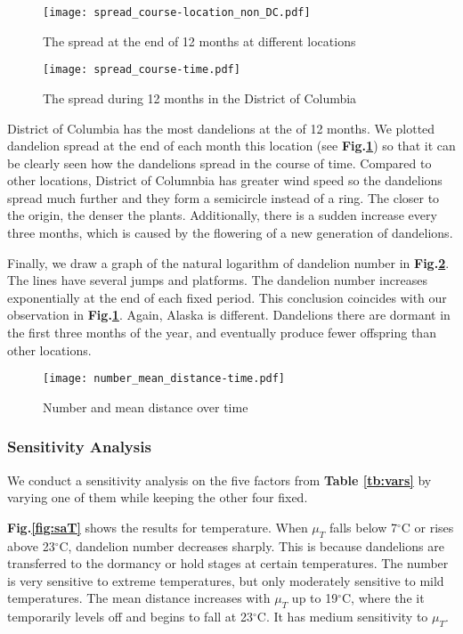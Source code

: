 \documentclass[12pt]{article}
\begin{document}
			\begin{figure}[htbp]
				\centering
				\texttt{[image: spread\_course-location\_non\_DC.pdf]}
				\caption{The spread at the end of 12 months at different locations}
				\label{fig:scatter5loc}
				
				\vspace{1cm}

				\texttt{[image: spread\_course-time.pdf]}
				\caption{The spread during 12 months in the District of Columbia}
				\label{fig:spreadDC}
			\end{figure}
			\newpage
			
			District of Columbia has the most dandelions at the of 12 months.  We plotted dandelion spread at the end of each month this location (see \textbf{Fig.\ref{fig:spreadDC}}) so that it can be clearly seen how the dandelions spread in the course of time.  Compared to other locations, District of Columnbia has greater wind speed so the dandelions spread much further and they form a semicircle instead of a ring.  The closer to the origin, the denser the plants.  Additionally, there is a sudden increase every three months, which is caused by the flowering of a new generation of dandelions.
			
			Finally, we draw a graph of the natural logarithm of dandelion number in \textbf{Fig.\ref{fig:time}}.  The lines have several jumps and platforms.  The dandelion number increases exponentially at the end of each fixed period.  This conclusion coincides with our observation in \textbf{Fig.\ref{fig:spreadDC}}.  Again, Alaska is different.  Dandelions there are dormant in the first three months of the year, and eventually produce fewer offspring than other locations.
			
			\begin{figure}[htbp]
				\centering
				\texttt{[image: number\_mean\_distance-time.pdf]}
				\caption{Number and mean distance over time}
				\label{fig:time}
			\end{figure}
		
		
		
		\subsubsection{Sensitivity Analysis}
			
			We conduct a sensitivity analysis on the five factors from \textbf{Table \ref{tb:vars}} by varying one of them while keeping the other four fixed.  
			
			\textbf{Fig.\ref{fig:saT}} shows the results for temperature.  When $\mu_T$ falls below 7$^\circ$C or rises above 23$^\circ$C, dandelion number decreases sharply.  This is because dandelions are transferred to the dormancy or hold stages at certain temperatures.  The number is very sensitive to extreme temperatures, but only moderately sensitive to mild temperatures.  The mean distance increases with $\mu_T$ up to 19$^\circ$C, where the it temporarily levels off and begins to fall at 23$^\circ$C.  It has medium sensitivity to $\mu_T$.
			
\end{document}
